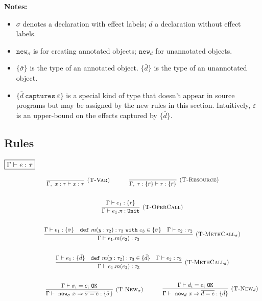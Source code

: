\documentclass{llncs}
\newcommand{\keywadj}[1]{\mathtt{#1}}
\newcommand{\keyw}[1]{\keywadj{#1}~}
\begin{document}
\noindent \textbf{Notes:}
\begin{itemize}
	\item $\sigma$ denotes a declaration with effect labels; $d$ a declaration without effect labels.
	\item $\keywadj{new}_\sigma$ is for creating annotated objects; $\keywadj{new}_d$ for unannotated objects.
	\item $\{ \bar \sigma \}$ is the type of an annotated object. $\{ \bar d \}$ is the type of an unannotated object.
	\item $\{ \bar d ~\keyw{captures} \varepsilon \}$ is a special kind of type that doesn't appear in source programs but may be assigned by the new rules in this section. Intuitively, $\varepsilon$ is an upper-bound on the effects captured by $\{ \bar d \}$.
\end{itemize}

\subsection{Rules}

$\fbox{$\Gamma \vdash e : \tau$}$

\[
\begin{array}{c}
\infer[\textsc{(T-Var)}]
	{\Gamma,~x : \tau \vdash x : \tau}
	{}
~~~~~~~~~~
\infer[\textsc{(T-Resource)}]
	{\Gamma,~r : \{ \bar r \} \vdash r : \{ \bar r \}}
	{} \\[5ex]
~~~~~~~~~~
\infer[\textsc{(T-OperCall)}]
	{\Gamma \vdash e_1.\pi : \keywadj{Unit}}
	{\Gamma \vdash e_1 : \{ \bar r \}} \\[5ex]
~~~~~~~~~~
\infer[\textsc{(T-MethCall$_\sigma$)}]
	{\Gamma \vdash e_1.m(e_2) : \tau_3}
	{\Gamma \vdash e_1 : \{ \bar \sigma \} & \keyw{def} m(y : \tau_2) : \tau_3~\keyw{with} \varepsilon_3 \in \{ \bar \sigma \} &  \Gamma \vdash e_2 : \tau_2 }\\[5ex]
~~~~~~~~~~
\infer[\textsc{(T-MethCall$_d$)}]
	{\Gamma \vdash e_1.m(e_2) : \tau_3}
	{\Gamma \vdash e_1 : \{ \bar d\} & \keyw{def} m(y : \tau_2) : \tau_3 \in \{ \bar d \} &  \Gamma \vdash e_2 : \tau_2 }\\[5ex]
~~~~~~~~~~

~~~~~~~~~~
\infer[\textsc{(T-New$_\sigma$)}]
	{\Gamma \vdash~\keywadj{new}_\sigma~x \Rightarrow \overline{\sigma = e} : \{ \bar \sigma \}}
	{\Gamma \vdash \sigma_i = e_i~\keywadj{OK}}
~~~~~~~~~~
\infer[\textsc{(T-New$_d$)}]
	{\Gamma \vdash~\keywadj{new}_d~x \Rightarrow \overline{d = e} : \{ \bar d \}}
	{\Gamma \vdash d_i = e_i~\keywadj{OK}}\\[5ex]
\end{array}
\]
\end{document}
